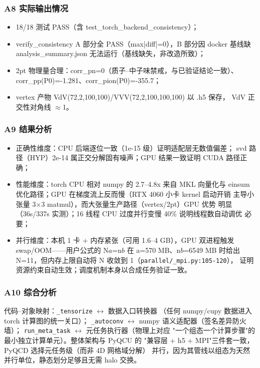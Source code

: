 \documentclass[UTF8]{ctexart}
\begin{document}
\subsubsection{A8 实际输出情况}
\begin{itemize}
\item 18/18 测试 PASS（含 test\_torch\_backend\_consistency）；
\item verify\_consistency A 部分全 PASS（max|diff|=0），B 部分因 docker
基线缺 analysis\_summary.json 无法运行（基线缺失，非改造所致）；
\item 2pt 物理量合理：corr\_pn=0（质子--中子味禁戒，与已验证结论一致）、
corr\_pp(P0)=-1.281、corr\_pion(P0)=-355.7；
\item vertex 产物 VdV(72,2,100,100)/VVV(72,2,100,100,100) 以 .h5 保存，
VdV 正交性对角线 $\approx$1。
\end{itemize}

\subsubsection{A9 结果分析}
\begin{itemize}
\item 正确性维度：CPU 后端逐位一致（1e-15 级）证明适配层无数值偏差；
svd 路径（HYP）2e-14 属正交分解固有噪声；GPU 结果一致证明 CUDA 路径正确；
\item 性能维度：torch CPU 相对 numpy 的 2.7--4.8x 来自 MKL 向量化与
einsum 优化路径；GPU 在梯度流上反而慢（RTX 4060 小卡 kernel 启动开销
主导小张量 3$\times$3 matmul），而大张量生产路径（vertex/2pt）GPU 优势
明显（36s/337s 实测）；16 线程 CPU 过度并行变慢 40\% 说明线程数自动调优
必要；
\item 并行维度：本机 1 卡 + 内存紧张（可用 1.6--4 GB），GPU 双进程触发
swap/OOM——用户公式的 N$a$=n$b$ 在 a=570 MB、n$b$=6549 MB 时给出
N=11，但内存上限自动将 N 收敛到 1（\texttt{\nolinkurl{parallel/_mpi.py:105-120}}），
证明资源约束自动生效；调度机制本身以合成任务验证一致。
\end{itemize}

\subsubsection{A10 综合分析}
代码--对象映射：\texttt{\nolinkurl{_tensorize}} $\leftrightarrow$ 数据入口转换器
（任何 numpy/cupy 数据进入 torch 计算图的统一关口）；
\texttt{\nolinkurl{_autoconv}} $\leftrightarrow$ numpy 语义适配器（签名差异防火墙）；
\texttt{\nolinkurl{run_meta_task}} $\leftrightarrow$ 元任务执行器（物理上对应
"一个组态一个计算步骤"的最小独立计算单元）。整体架构与 PyQCU 的
"兼容层 + h5 + MPI"三件套一致，PyQCD 选择元任务级（而非 4D 网格域分解）
并行，因为其管线以组态为天然并行单位，静态划分足够且无需 halo 交换。
\end{document}
